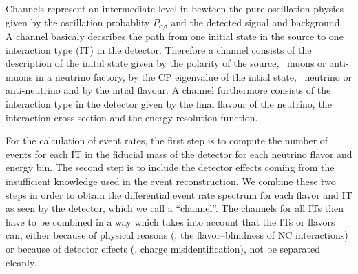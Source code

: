 Channels represent an intermediate level in bewteen 
the pure oscillation 
physics given by the oscillation probablity $P_{\alpha\beta}$ and the
detected signal and background. A channel basicaly decsribes the path from one
initial state in the source to one interaction type (IT) in  the detector.  
Therefore a channel consists of the description of the inital state given 
by the polarity 
of the source, \eg\ muons or anti-muons in a neutrino factory, by the CP 
eigenvalue of the intial state, \ie\ neutrino or anti-neutrino and by the 
intial flavour. A channel furthermore consists of the interaction type in the
detector given by the final flavour of the neutrino, the interaction cross
section and the energy resolution function. 
 
For the calculation of event rates, the first step is to compute the number of
events for each IT in the fiducial mass of the detector for each 
neutrino flavor and energy bin. The second step is to include the detector 
effects coming from
the insufficient knowledge used in the event reconstruction. We combine these
two steps in order to obtain the differential event rate spectrum for each
flavor and IT as seen by the detector, which we call a ``channel''. 
The channels
for all ITs then have to be combined in a way which takes into account
that the ITs or flavors can, either because of
physical reasons (\eg, the flavor--blindness of NC interactions) or 
because of detector effects (\eg, charge misidentification), not be 
 separated cleanly.

